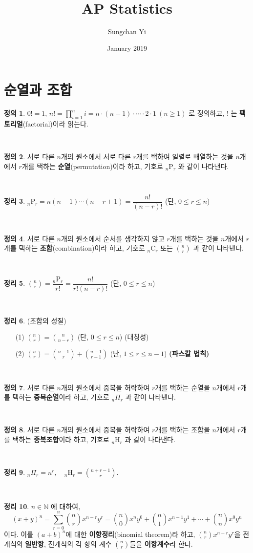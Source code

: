 \documentclass[12pt]{article}
\title{\textbf{AP Statistics}}
\author{Sungchan Yi}
\date{January 2019}
\theoremstyle{definition}
\newtheorem{theorem}{\sffamily 정리}[section]
\theoremstyle{definition}
\newtheorem{definition}[theorem]{\sffamily 정의}
\newcommand{\defn}[1]{\begin{definition}#1\end{definition}~}
\newcommand{\thm}[1]{\begin{theorem}{#1}\end{theorem}~}
\newcommand{\p}[2]{_{#1}\text{P}_{#2}}
\newcommand{\ds}{\displaystyle}
\begin{document}
\maketitle

\tableofcontents
\pagebreak
\section{순열과 조합}
\defn{$0!=1$, $n! = \displaystyle \prod_{i=1}^n i  = n\cdot(n-1)\cdot\cdots\cdot2\cdot 1 \: (n\geq 1)$ 로 정의하고, $!$ 는 \textbf{팩토리얼}(factorial)이라 읽는다.}
\defn{서로 다른 $n$개의 원소에서 서로 다른 $r$개를 택하여 일렬로 배열하는 것을 $n$개에서 $r$개를 택하는 \textbf{순열}(permutation)이라 하고, 기호로 $\p{n}{r}$ 와 같이 나타낸다.}

\thm{$\p{n}{r} = n(n-1)\cdots(n-r+1) = \dfrac{n!}{(n-r)!}$ \quad (단, $0\leq r\leq n$)}

\defn{서로 다른 $n$개의 원소에서 순서를 생각하지 않고 $r$개를 택하는 것을 $n$개에서 $r$개를 택하는 \textbf{조합}(combination)이라 하고, 기호로 $_{n}\text{C}_{r}$ 또는 $\displaystyle {n \choose r}$ 과 같이 나타낸다.}

\thm{$\displaystyle {n \choose r} = \dfrac{\p{n}{r}}{r!} = \dfrac{n!}{r!(n-r)!}$ \quad (단, $0\leq r\leq n$)}

\thm{(조합의 성질) 
\begin{enumerate}
	\item[(1)] $\displaystyle {n \choose r} = {n \choose n - r}$ \quad (단, $0\leq r\leq n$) (대칭성) 
	\item[(2)] $\ds {n\choose r} = {n-1\choose r} + {n-1\choose r-1} $ \quad (단, $1\leq r\leq n-1$) \textbf{(파스칼 법칙)} 
\end{enumerate}}

\defn{서로 다른 $n$개의 원소에서 중복을 허락하여 $r$개를 택하는 순열을 $n$개에서 $r$개를 택하는 \textbf{중복순열}이라 하고, 기호로 $_n \Pi_r$ 과 같이 나타낸다.}

\defn{서로 다른 $n$개의 원소에서 중복을 허락하여 $r$개를 택하는 조합을 $n$개에서 $r$개를 택하는 \textbf{중복조합}이라 하고, 기호로 $_n \text{H}_r$ 과 같이 나타낸다.}

\thm{$\ds _n \Pi_r = n^r, \quad _n \text{H}_r = {n+r-1 \choose r}$.}

\thm{$n\in\mathbb{N}$ 에 대하여, $$(x+y)^n = \sum_{r=0}^n {n\choose r} x^{n-r}y^{r} = {n \choose 0}x^ny^0 + {n\choose 1}x^{n-1}y^1+\cdots + {n\choose n}x^0y^n$$ 이다. 이를 $ (a+b)^n $에 대한 \textbf{이항정리}(binomial theorem)라 하고, $\ds{n\choose r}x^{n-r}y^r$을 전개식의 \textbf{일반항}, 전개식의 각 항의 계수 $\ds {n\choose r} $들을 \textbf{이항계수}라 한다.}
\end{document}
